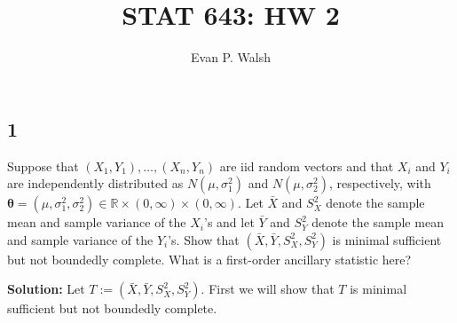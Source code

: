 \documentclass[12pt]{article}
\title{STAT 643: HW 2}
\author{Evan P. Walsh}
\begin{document}
\maketitle


\subsection*{1}
\begin{tcolorbox}
Suppose that $(X_1,Y_1),\ldots, (X_n,Y_n)$ are iid random vectors and that $X_i$ and $Y_i$ are independently distributed as 
$N(\mu,\sigma^2_1)$ and $N(\mu,\sigma^2_2)$, respectively, with $\bm{\theta}=(\mu,\sigma_1^2,\sigma_2^2)\in \mathbb{R}\times (0,\infty)\times (0,\infty)$.  Let $\bar{X}$ and $S_X^2$ denote the sample mean  and sample variance of the $X_i$'s and let
$\bar{Y}$ and $S_Y^2$ denote the sample mean  and sample variance of the $Y_i$'s.  Show that $(\bar{X},\bar{Y},S_X^2,S_Y^2)$ is minimal sufficient
but not boundedly complete.  What is a first-order ancillary statistic here?
\end{tcolorbox}
\textbf{Solution:} Let $T := (\bar{X}, \bar{Y}, S_{X}^{2}, S_{Y}^{2})$. First we will show that $T$ is minimal sufficient but not boundedly complete.
\end{document}
